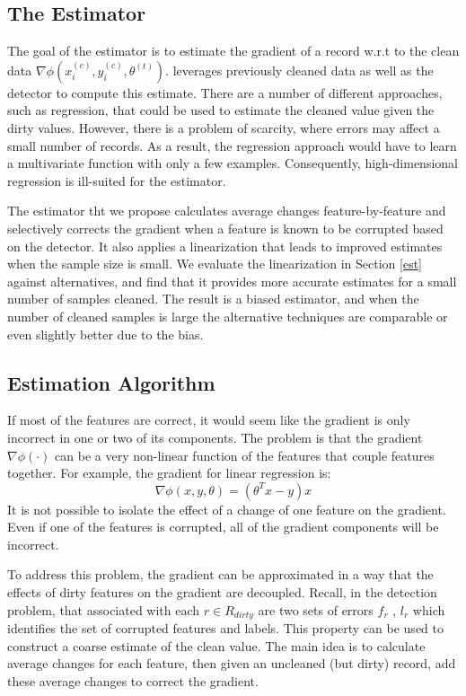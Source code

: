\subsection{The Estimator}\label{sampling}
The goal of the estimator is to estimate the gradient of a record w.r.t to the clean data $\nabla\phi(x^{(c)}_i,y^{(c)}_i,\theta^{(t)})$.
\sys leverages previously cleaned data as well as the detector to compute this estimate.
There are a number of different approaches, such as regression, that could be used to estimate the cleaned value given the dirty values.
However, there is a problem of scarcity, where errors may affect a small number of records.
As a result, the regression approach would have to learn a multivariate function with only a few examples.
Consequently, high-dimensional regression is ill-suited for the estimator.

The estimator tht we propose calculates average changes feature-by-feature and selectively corrects the gradient when a feature is known to be corrupted based on the detector.
It also applies a linearization that leads to improved estimates when the sample size is small.
We evaluate the linearization in Section \ref{est} against alternatives, and find that it provides more accurate estimates for a small number of samples cleaned.
The result is a biased estimator, and when the number of cleaned samples is large the alternative techniques are comparable or even slightly better due to the bias.

\subsection{Estimation Algorithm}
If most of the features are correct, it would seem like the gradient is only
incorrect in one or two of its components.
The problem is that the gradient $\nabla\phi(\cdot)$ can be a very non-linear function of the features that couple features together.
For example, the gradient for linear regression is:
\[
\nabla\phi(x,y,\theta) = (\theta^Tx - y)x
\]
It is not possible to isolate the effect of a change of one feature on the gradient.
Even if one of the features is corrupted, all of the gradient components will be incorrect.

To address this problem, the gradient can be approximated in a way that the effects of dirty features on the gradient are decoupled.
Recall, in the detection problem, that associated with each $r \in R_{dirty}$ are two sets of errors $f_r$ , $l_r$ which identifies the set of corrupted features and labels.
This property can be used to construct a coarse estimate of the clean value.
The main idea is to calculate average changes for each feature, then given an uncleaned (but dirty) record, add these average changes to correct the gradient.

